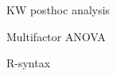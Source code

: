 \documentclass[smaller]{beamer}
\begin{document}
\begin{frame}{KW posthoc analysis}
 
\end{frame}


\begin{frame}{Multifactor ANOVA}
 
\end{frame}

\begin{frame}{R-syntax}

\end{frame}




\end{document}
